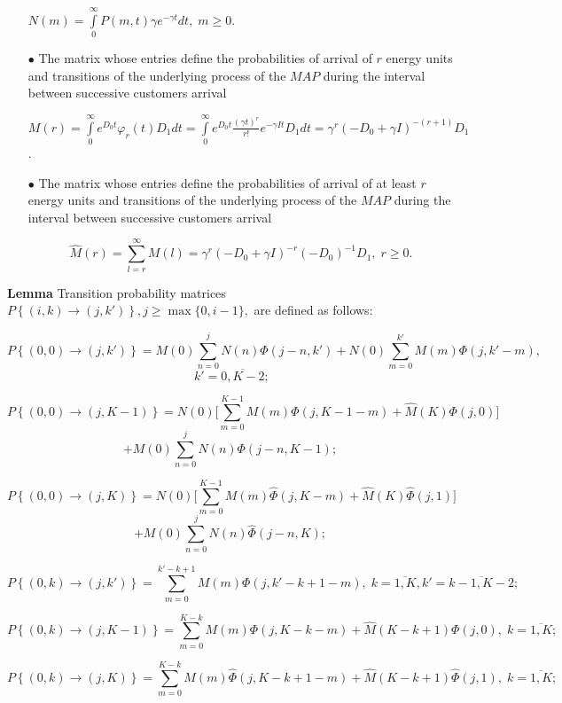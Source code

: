 \documentclass[12pt, a4paper]{article}
\begin{document}
\begin{itemize}
$ N(m) = \int\limits_{0}^{\infty} P(m, t)\gamma e^{-\gamma t}dt,\; m \ge 0$.

\item[$\bullet$]
The matrix whose entries  define the probabilities of arrival of $r$ energy units  and transitions of the underlying process  of the $MAP$ during  the interval between successive customers arrival

$ M(r) = \int\limits_{0}^{\infty} e^{D_{0}t}\varphi_{r}(t)D_{1}dt =
	\int\limits_{0}^{\infty} e^{D_{0}t}\frac{(\gamma t)^{r} }{r!} e^{-\gamma I t}D_{1}dt = \gamma^{r}(-D_{0} +  \gamma I)^{-(r+1)}D_{1}
$.

\item[$\bullet$]
The matrix whose entries  define the probabilities of arrival of at least $r$ energy units  and transitions of the underlying process  of the $MAP$ during  the interval between successive customers arrival


$$ \hat M(r) = \sum\limits_{l=r}^{\infty} M(l)=\gamma^{r}(-D_{0} +  \gamma I)^{-r}(-D_0)^{-1}D_{1},\; r \ge 0.$$

\end{itemize}

{\bf Lemma}
Transition probability matrices  $P\left\{(i,k) \to (j, k')\right\}, j\geq \max\{0, i-1\},$ are defined as follows:

$$P\left\{(0, 0) \to (j, k' ) \right\}=M(0)\sum\limits_{n = 0}^{j}N(n)\Phi(j-n, k') + N(0)\sum\limits_{m = 0}^{k'}M(m)\Phi(j, k' - m),$$
$$\; k'= {\overline{0,K-2}};$$


$$P\left\{(0, 0) \to (j,K-1 ) \right\}= N(0)\biggl[\sum\limits_{m = 0}^{K-1}M(m)\Phi(j, K-1 - m)
+\hat {M}(K) \Phi(j, 0)\biggr] $$$$+M(0)\sum\limits_{n = 0}^{j}N(n)\Phi(j-n, K-1);$$


$$P\left\{(0, 0) \to (j, K) \right\}= N(0)\biggl[\sum\limits_{m = 0}^{K-1}M(m)\hat\Phi(j, K - m) + \hat M(K)\hat \Phi(j, 1)\biggr]
$$$$+M(0)\sum\limits_{n = 0}^{j}N(n)\hat\Phi(j-n, K);$$

$$P\left\{(0, k) \to (j, k') \right\}=\sum\limits_{m = 0}^{k'-k+1}M(m)\Phi(j,k' - k + 1 - m),\;  k=\overline{1,K}, k' =\overline{k-1, {K-2}};$$

{$$P\left\{(0, k) \to (j, K-1) \right\}=\sum\limits_{m = 0}^{K-k}M(m)\Phi(j,K-k - m)+
\hat{M}(K-k+1)\Phi(j,0),\; k=\overline{1,K};
$$
 }

$$P\left\{(0, k) \to (j, K)\right\}=\sum\limits_{m = 0}^{K-k}M(m) \hat \Phi(j, K - k + 1 - m) + \hat M(K - k + 1)\hat \Phi(j, 1),\;  k =\overline{1,K};$$
\end{document}
